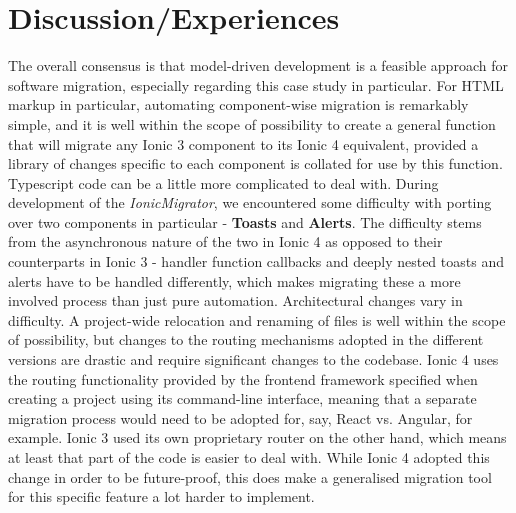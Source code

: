 \documentclass[conference]{IEEEtran}
\begin{document}
\section{Discussion/Experiences}
The overall consensus is that model-driven development is a feasible approach
for software migration, especially regarding this case study in particular.
\newline \newline
For HTML markup in particular, automating component-wise migration is remarkably simple, and it
is well within the scope of possibility to create a general function that will migrate any Ionic
3 component to its Ionic 4 equivalent, provided a library of changes specific to each component
is collated for use by this function.
\newline \newline
Typescript code can be a little more complicated to deal with. During development of the \textit{IonicMigrator},
we encountered some difficulty with porting over two components in particular - \textbf{Toasts} and
\textbf{Alerts}. The difficulty stems from the asynchronous nature of the two in Ionic 4 as opposed to their
counterparts in Ionic 3 - handler function callbacks and deeply nested toasts and alerts have to be handled differently,
which makes migrating these a more involved process than just pure automation.
\newline \newline
Architectural changes vary in difficulty. A project-wide relocation and renaming of files is well within the
scope of possibility, but changes to the routing mechanisms adopted in the different versions are drastic and
require significant changes to the codebase. Ionic 4 uses the routing functionality provided by the frontend framework
specified when creating a project using its command-line interface, meaning that a separate migration process would need
to be adopted for, say, React vs. Angular, for example. Ionic 3 used its own proprietary router on the other hand, which means
at least that part of the code is easier to deal with. While Ionic 4 adopted this change in order to be future-proof, this does
make a generalised migration tool for this specific feature a lot harder to implement.

\end{document}
